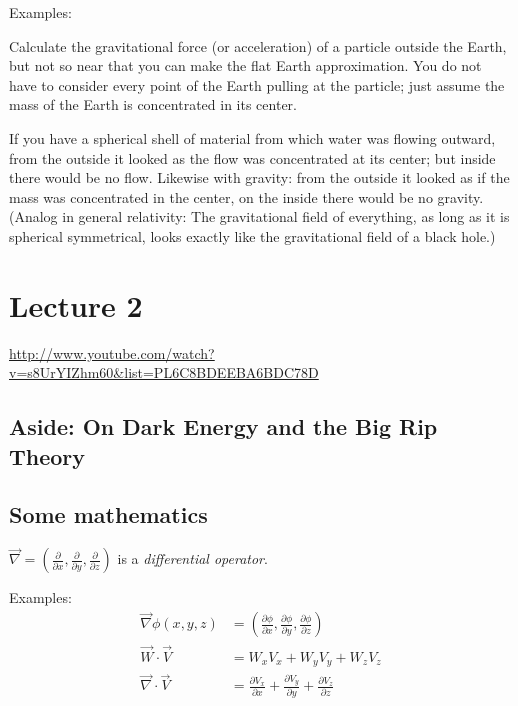 \documentclass[pagesize,headsepline,10pt,parskip=half,BCOR=12mm]{scrreprt}
\begin{document}
        Examples:
        \begin{compactitem}
          \item Calculate the gravitational force (or acceleration)
            of a particle outside the Earth, but not so near that
            you can make the flat Earth approximation.  You do not
            have to consider every point of the Earth pulling at
            the particle; just assume the mass of the Earth is
            concentrated in its center.
          \item If you have a spherical shell of material from
            which water was flowing outward, from the outside it
            looked as the flow was concentrated at its center; but
            inside there would be no flow. Likewise with gravity:
            from the outside it looked as if the mass was
            concentrated in the center, on the inside there
            would be no gravity.  (Analog in general relativity:
            The gravitational field of everything, as long as it is
            spherical symmetrical, looks exactly like the
            gravitational field of a black hole.)
        \end{compactitem}
  \chapter{Lecture 2}
    \url{http://www.youtube.com/watch?v=s8UrYIZhm60&list=PL6C8BDEEBA6BDC78D}
    \section{Aside: On Dark Energy and the Big Rip Theory}
    \section{Some mathematics}
      $\vec \nabla = \left(\frac{\partial}{\partial x},
      \frac{\partial}{\partial y}, \frac{\partial}{\partial
      z}\right)$ is a \emph{differential operator}.

      Examples:
      \begin{align*}
        \vec \nabla \phi(x, y, z) &= \left(\frac{\partial
        \phi}{\partial x}, \frac{\partial \phi}{\partial y}, \frac{\partial
        \phi}{\partial z}\right)\\
        \vec W \cdot \vec V &= W_x V_x + W_y V_y + W_z V_z\\
        \vec \nabla \cdot \vec V &= \frac{\partial V_x}{\partial x}
        + \frac{\partial V_y}{\partial y} + \frac{\partial
        V_z}{\partial z}
      \end{align*}
\end{document}
